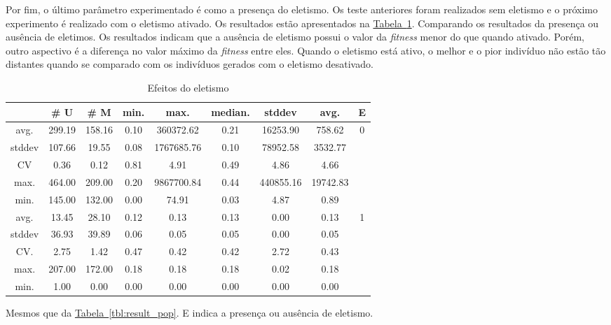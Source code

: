 \documentclass[a4paper]{paper}
\begin{document}
Por fim, o último parâmetro experimentado é como a presença do eletismo. Os
teste anteriores foram realizados sem eletismo e o próximo experimento é
realizado com o eletismo ativado. Os resultados estão apresentados na
\hyperref[tbl:var_eletism]{Tabela~\ref*{tbl:var_eletism}}. Comparando os resultados
da presença ou ausência de eletimos. Os resultados indicam que a ausência de
eletismo possui o valor da \textit{fitness} menor do que quando ativado. Porém,
outro aspectivo é a diferença no valor máximo da \textit{fitness} entre eles.
Quando o eletismo está ativo, o melhor e o pior indivíduo não estão tão distantes
quando se comparado com os indivíduos gerados com o eletismo desativado.

\begin{table}
  \center
  \caption{Efeitos do eletismo}
  \label{tbl:var_eletism}
  \begin{tabular}{| c | c | c | c | c | c | c | c | c |}
    \hline
    &  \# U & \# M & min. & max. & median. & stddev & avg. & E \\ \hline \hline
avg. & 299.19 & 158.16 & 0.10 & 360372.62 & 0.21 & 16253.90 & 758.62 & \multirow{5}{1.5cm}{0} \\ \cline{1-8}
stddev & 107.66 & 19.55 & 0.08 & 1767685.76 & 0.10 & 78952.58 & 3532.77 & \\ \cline{1-8}
CV & 0.36 & 0.12 & 0.81 & 4.91 & 0.49 & 4.86 & 4.66 & \\ \cline{1-8}
max. & 464.00 & 209.00 & 0.20 & 9867700.84 & 0.44 & 440855.16 & 19742.83 & \\ \cline{1-8}
min. & 145.00 & 132.00 & 0.00 & 74.91 & 0.03 & 4.87 & 0.89 & \\ \hline \hline
avg. & 13.45 & 28.10 & 0.12 & 0.13 & 0.13 & 0.00 & 0.13 & \multirow{5}{1.5cm}{1} \\ \cline{1-8}
stddev & 36.93 & 39.89 & 0.06 & 0.05 & 0.05 & 0.00 & 0.05 & \\ \cline{1-8}
CV. & 2.75 & 1.42 & 0.47 & 0.42 & 0.42 & 2.72 & 0.43 & \\ \cline{1-8}
max. & 207.00 & 172.00 & 0.18 & 0.18 & 0.18 & 0.02 & 0.18 & \\ \cline{1-8}
min. & 1.00 & 0.00 & 0.00 & 0.00 & 0.00 & 0.00 & 0.00 & \\ \hline 
  \end{tabular}
    \begin{minipage}{0.9\textwidth}
    {\footnotesize
      Mesmos que da \hyperref[tbl:result_pop]{Tabela~\ref*{tbl:result_pop}}.
      E indica a presença ou ausência de eletismo.
    }
  \end{minipage}
\end{table}
\end{document}
